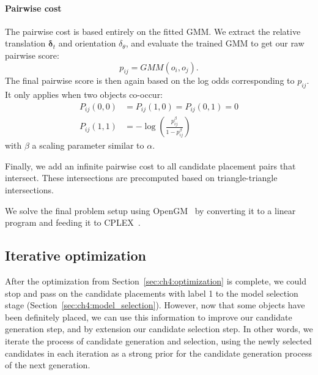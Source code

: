 \documentclass[10pt,twocolumn,letterpaper]{article}
\newcommand{\bb}[1]{{\bm{#1}}}
\begin{document}
\paragraph{Pairwise cost} The pairwise cost is based entirely on the fitted GMM. We extract
the relative translation $\bb{\delta}_t$ and orientation $\delta_\theta$, and evaluate
the trained GMM to get our raw pairwise score:
\[ p_{ij} = GMM(o_i, o_j). \]
The final pairwise score is then again based on the log odds corresponding to $p_{ij}$. It only applies when two objects co-occur:
\begin{align}
    P_{ij}(0, 0) &= P_{ij}(1, 0) = P_{ij}(0, 1) = 0 \\
    P_{ij}(1, 1) &= -\log\left(\frac{p_{ij}^\beta}{1 - p_{ij}^\beta}\right)
\end{align}
with $\beta$ a scaling parameter similar to $\alpha$.

Finally, we add an infinite pairwise cost to all candidate placement pairs that
intersect. These intersections are precomputed based on triangle-triangle
intersections.

We solve the final problem setup using OpenGM~\cite{OpenGM} by converting it to
a linear program and feeding it to CPLEX~\cite{CPLEX}.

\subsection{Iterative optimization}
\label{sec:ch4:iteration}
After the optimization from Section~\ref{sec:ch4:optimization} is complete, we
could stop and pass on the candidate placements with label 1 to the model
selection stage (Section~\ref{sec:ch4:model_selection}).  However, now that
some objects have been definitely placed, we can use this information to
improve our candidate generation step, and by extension our candidate selection
step. In other words, we iterate the process of candidate generation and
selection, using the newly selected candidates in each iteration as a strong prior for the
candidate generation process of the next generation.
\end{document}
